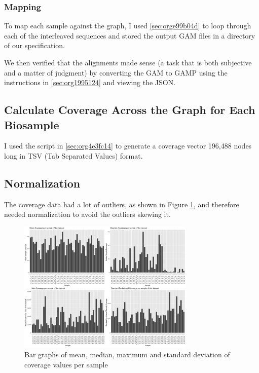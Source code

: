 \documentclass[10pt, a4paper]{article}
\begin{document}
\subsubsection{Mapping}
\label{sec:org97e79d7}
To map each sample against the graph, I used \ref{sec:orge99b04d} to loop through 
each of the interleaved sequences and stored the output GAM files in a 
directory of our specification.

We then verified that the alignments made sense
(a task that is both subjective and a matter of judgment) by converting the GAM 
to GAMP using the instructions in \ref{sec:org1995124} and viewing the JSON.

\subsection{Calculate Coverage Across the Graph for Each Biosample}
\label{sec:org6be1e5c}
I used the script in \ref{sec:org4e3fc14} to generate a coverage vector 196,488 nodes
long in TSV (Tab Separated Values) format.

\subsection{Normalization}
\label{sec:orgf3a0f4e}
The coverage data had a lot of outliers, as shown in Figure
\ref{fig:org15d4c5b}, and therefore needed normalization to avoid the outliers
skewing it.

\begin{figure}[h]
\centering
\includegraphics[width=0.75\textwidth]{../Figures/RSV/structure_of_coverage_data.png}
\caption[RSV Structure of the Data]{\label{fig:org15d4c5b}Bar graphs of mean, median, maximum and standard deviation of coverage values per sample}
\end{figure}
\end{document}
